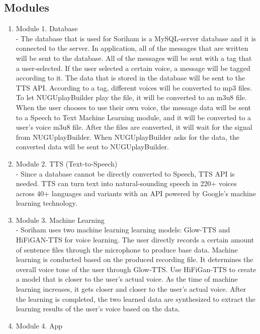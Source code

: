 \documentclass[conference]{IEEEtran}
\begin{document}
\subsection{Modules}
\begin{enumerate}
    \item Module 1. Database\\
    - The database that is used for Soriham is a MySQL-server database and it is connected to the server. In application, all of the messages that are written will be sent to the database. All of the messages will be sent with a tag that a user-selected. If the user selected a certain voice, a message will be tagged according to it. The data that is stored in the database will be sent to the TTS API. According to a tag, different voices will be converted to mp3 files. To let NUGUplayBuilder play the file, it will be converted to an m3u8 file. When the user chooses to use their own voice, the message data will be sent to a Speech to Text Machine Learning module, and it will be converted to a user's voice m3u8 file.  After the files are converted, it will wait for the signal from NUGUplayBuilder. When NUGUplayBuilder asks for the data, the converted data will be sent to NUGUplayBuilder.\\
    \item Module 2. TTS (Text-to-Speech)\\
    - Since a database cannot be directly converted to Speech, TTS API is needed. TTS can turn text into natural-sounding speech in 220+ voices across 40+ languages and variants with an API powered by Google's machine learning technology.\\
    \item Module 3. Machine Learning\\
    - Soriham uses two machine learning learning models: Glow-TTS and HiFiGAN-TTS for voice learning. The user directly records a certain amount of sentence files through the microphone to produce base data. Machine learning is conducted based on the produced recording file. It determines the overall voice tone of the user through Glow-TTS. Use HiFiGan-TTS to create a model that is closer to the user's actual voice. As the time of machine learning increases, it gets closer and closer to the user's actual voice. After the learning is completed, the two learned data are synthesized to extract the learning results of the user's voice based on the data.\\
    \item Module 4. App\\

\end{enumerate}
\end{document}
